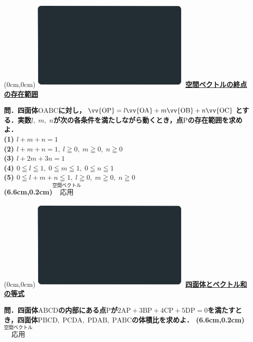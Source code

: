 \documentclass[10pt,
fleqn,
dvipdfmx,
uplatex
]{jsarticle}
\begin{document}
\at(0cm,0cm){\includegraphics[width=8cm,bb=0 0 1920 1080]{./youtube/thumbnails/templates/smart_background/空間ベクトル.jpeg}}
{\color{orange}\bf\boldmath\Large\underline{空間ベクトルの終点の存在範囲}}\vspace{0.3zw}

\small 
\bf\boldmath 問．四面体$\text{OABC}$に対し，$\vv {\text{OP}}=l\vv {\text{OA}}+m\vv {\text{OB}}+n\vv {\text{OC}}$とする．実数$l,\;m,\;n$が次の各条件を満たしながら動くとき，点$\text{P}$の存在範囲を求めよ．\\
(1)  $l+m+n=1$\\
(2)  $l+m+n=1,\;l\geqq 0,\;m\geqq 0,\;n\geqq 0$\\
(3)  $l+2m+3n=1$\\
(4)  $0\leqq l\leqq 1,\;0\leqq m\leqq 1,\;0\leqq n\leqq 1$\\
(5)  $0\leqq l+m+n\leqq 1,\;l\geqq 0,\;m\geqq 0,\;n\geqq 0$\\

\at(6.6cm,0.2cm){\small\color{bradorange}$\overset{\text{空間ベクトル}}{\text{応用}}$}


\newpage



\at(0cm,0cm){\includegraphics[width=8cm,bb=0 0 1920 1080]{./youtube/thumbnails/templates/smart_background/空間ベクトル.jpeg}}
{\color{orange}\bf\boldmath\Large\underline{四面体とベクトル和の等式}}\vspace{0.3zw}

\Large 
\bf\boldmath 問．四面体$\text{ABCD}$の内部にある点$\text{P}$が$2\text{AP}+3\text{BP}+4\text{CP}+5\text{DP}=0$を満たすとき，四面体$\text{PBCD},\;\text{PCDA},\;\text{PDAB},\;\text{PABC}$の体積比を求めよ．
\at(6.6cm,0.2cm){\small\color{bradorange}$\overset{\text{空間ベクトル}}{\text{応用}}$}
\end{document}
